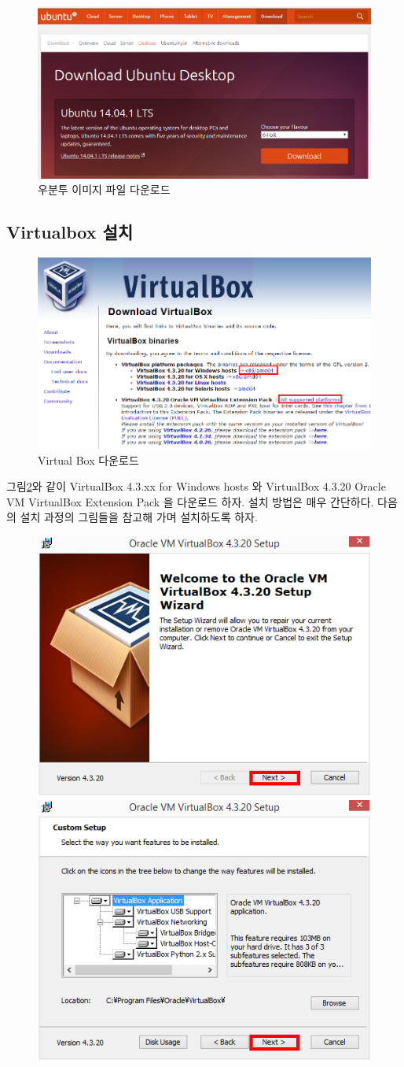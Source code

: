 \begin{figure}[h]
\centering\includegraphics[width=0.5\columnwidth]{pictures/chapter3/ubuntu_web.png}
\caption{우분투 이미지 파일 다운로드}
\label{fig:download_ubuntu}
\end{figure}

\subsection{Virtualbox 설치}

\begin{figure}[h]
\centering\includegraphics[width=0.7\columnwidth]{pictures/chapter3/virtual_box_web.png}
\caption{Virtual Box 다운로드}
\label{fig:download_vm}
\end{figure}

그림\ref{fig:download_vm}와 같이 VirtualBox 4.3.xx for Windows hosts 와 VirtualBox 4.3.20 Oracle VM VirtualBox Extension Pack 을 다운로드 하자. 설치 방법은 매우 간단하다. 다음의 설치 과정의 그림들을 참고해 가며 설치하도록 하자.

\begin{figure}[h]
\centering
\includegraphics[width=0.42\columnwidth]{pictures/chapter3/vm1.png}
\includegraphics[width=0.42\columnwidth]{pictures/chapter3/vm2.png}
\end{figure}

